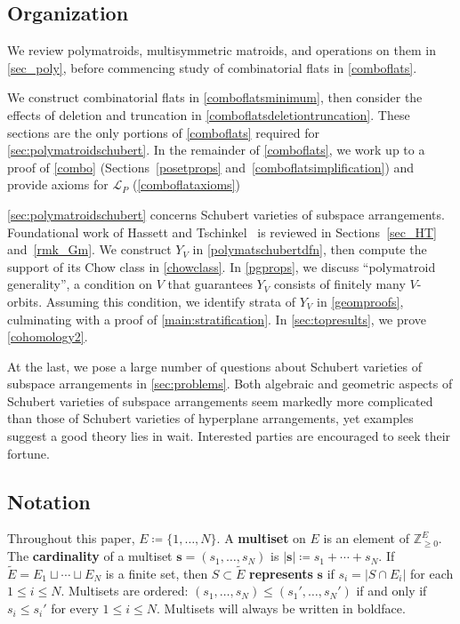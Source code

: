 \documentclass[11pt]{article}
\theoremstyle{definition}
\numberwithin{equation}{section}
\newcommand{\N}{\mathbb{Z}_{\geq 0}}
\newcommand{\word}[1]{\textbf{#1}}
\begin{document}
\subsection{Organization}
We review polymatroids, multisymmetric matroids, and operations on them in \cref{sec_poly}, before commencing study of combinatorial flats in \cref{comboflats}.

We construct combinatorial flats in \cref{comboflatsminimum}, then consider the effects of deletion and truncation in \cref{comboflatsdeletiontruncation}. These sections are the only portions of \cref{comboflats} required for \cref{sec:polymatroidschubert}.
In the remainder of \cref{comboflats},  we work up to a proof of \cref{combo} (Sections~\ref{posetprops} and~\ref{comboflatsimplification}) and provide axioms for $\mathcal L_P$ (\cref{comboflataxioms})

\cref{sec:polymatroidschubert} concerns Schubert varieties of subspace arrangements.
Foundational work of Hassett and Tschinkel~\cite{HT99} is reviewed in Sections~\ref{sec_HT} and~\ref{rmk_Gm}.
We construct $Y_V$ in \cref{polymatschubertdfn}, then compute the support of its Chow class in \cref{chowclass}.
In \cref{pgprops}, we discuss ``polymatroid generality'', a condition on $V$ that guarantees $Y_V$ consists of finitely many $V$-orbits.
Assuming this condition, we identify strata of $Y_V$ in \cref{geomproofs}, culminating with a proof of \cref{main:stratification}.
In \cref{sec:topresults}, we prove \cref{cohomology2}.

At the last, we pose a large number of questions about Schubert varieties of subspace arrangements in \cref{sec:problems}.
Both algebraic and geometric aspects of Schubert varieties of subspace arrangements seem markedly more complicated than those of Schubert varieties of hyperplane arrangements, yet examples suggest a good theory lies in wait.
Interested parties are encouraged to seek their fortune.

\subsection{Notation}\label{sec:notation}
Throughout this paper, $E \coloneqq \{1, \ldots, N\}$.
A \word{multiset} on $E$ is an element of $\N^E$.
The \word{cardinality} of a multiset $\mathbf s = (s_1, \ldots, s_N)$ is $|\mathbf s| \coloneqq s_1 + \cdots + s_N$.
If $\widetilde E = E_1 \sqcup \cdots \sqcup E_N$ is a finite set, then  $S \subset \widetilde E$ \word{represents}  $\mathbf s$ if $s_i = |S \cap E_i|$ for each $1 \leq i \leq N$.
Multisets are ordered: $(s_1, \ldots, s_N) \leq (s_1', \ldots, s_N')$  if and only if $s_i \leq s_i'$ for every $1 \leq i\leq N$.
Multisets will always be written in boldface.
\end{document}
